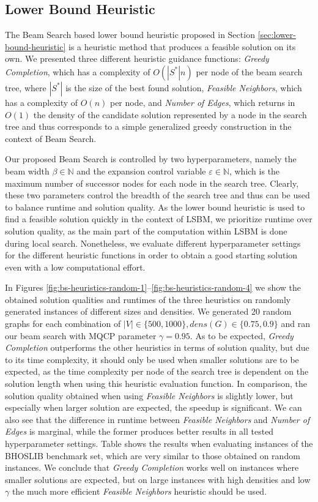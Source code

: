 \documentclass[draft,final]{vutinfth} %
\begin{document}
\subsection{Lower Bound Heuristic}
The Beam Search based lower bound heuristic proposed in Section \ref{sec:lower-bound-heuristic} is a heuristic method that produces a feasible solution on its own. We presented three different heuristic guidance functions: \emph{Greedy Completion}, which has a complexity of $O(|S^*|n)$ per node of the beam search tree, where $|S^*|$ is the size of the best found solution, \emph{Feasible Neighbors}, which has a complexity of $O(n)$ per node, and \emph{Number of Edges}, which returns in $O(1)$ the density of the candidate solution represented by a node in the search tree and thus corresponds to a simple generalized greedy construction in the context of Beam Search. 

Our proposed Beam Search is controlled by two hyperparameters, namely the beam width $\beta \in \mathbb{N}$ and the expansion control variable $\varepsilon \in \mathbb{N}$, which is the maximum number of successor nodes for each node in the search tree. Clearly, these two parameters control the breadth of the search tree and thus can be used to balance runtime and solution quality. 
As the lower bound heuristic is used to find a feasible solution quickly in the context of LSBM, we prioritize runtime over solution quality, as the main part of the computation within LSBM is done during local search. Nonetheless, we evaluate different hyperparameter settings for the different heuristic functions in order to obtain a good starting solution even with a low computational effort. 

In Figures \ref{fig:bs-heuristics-random-1}--\ref{fig:bs-heuristics-random-4} 
we show the obtained solution qualities and runtimes of the three heuristics on randomly generated instances of different sizes and densities. We generated 20 random graphs for each combination of $|V| \in \{500, 1000\}, dens(G) \in \{0.75, 0.9\}$ and ran our beam search with MQCP parameter $\gamma=0.95$. 
As to be expected, \emph{Greedy Completion} outperforms the other heuristics in terms of solution quality, but due to its time complexity, it should only be used when smaller solutions are to be expected, as the time complexity per node of the search tree is dependent on the solution length when using this heuristic evaluation function. 
In comparison, the solution quality obtained when using \emph{Feasible Neighbors} is slightly lower, but especially when larger solution are expected, the speedup is significant.  
We can also see that the difference in runtime between \emph{Feasible Neighbors} and \emph{Number of Edges} is marginal, while the former produces better results in all tested hyperparameter settings. 
Table %
shows the results when evaluating instances of the BHOSLIB benchmark set, which are very similar to those obtained on random instances. 
We conclude that \emph{Greedy Completion} works well on instances where smaller solutions are expected, but on large instances with high densities and low $\gamma$ the much more efficient \emph{Feasible Neighbors} heuristic should be used. 
\end{document}

